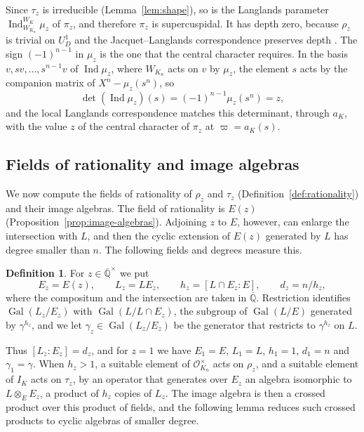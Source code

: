 \documentclass[a4paper,11pt]{amsart}
\theoremstyle{definition}
\newtheorem{definition}[theorem]{Definition}
\theoremstyle{remark}
\numberwithin{equation}{section}
\DeclareMathOperator{\Gal}{Gal}
\newcommand{\Qbar}{\overline{\mathbb{Q}}}
\newcommand{\OO}{\mathcal{O}}
\DeclareMathOperator{\Ind}{Ind}
\begin{document}
Since $\tau_z$ is irreducible (Lemma~\ref{lem:shape}), so is the Langlands parameter $\Ind_{W_{K_n}}^{W_K}\mu_z$ of $\pi_z$, and therefore $\pi_z$ is supercuspidal. It has depth zero, because $\rho_z$ is trivial on $U_D^1$ and the Jacquet--Langlands correspondence preserves depth \cite[Corollary~2.8]{ABPS16}. The sign $(-1)^{n-1}$ in $\mu_z$ is the one that the central character requires. In the basis $v,sv,\dots,s^{n-1}v$ of $\Ind\mu_z$, where $W_{K_n}$ acts on $v$ by $\mu_z$, the element $s$ acts by the companion matrix of $X^n-\mu_z(s^n)$, so
\[
 \det(\Ind\mu_z)(s)=(-1)^{n-1}\mu_z(s^n)=z,
\]
and the local Langlands correspondence matches this determinant, through $a_K$, with the value $z$ of the central character of $\pi_z$ at $\varpi=a_K(s)$.

\subsection{Fields of rationality and image algebras}\label{subsec:image-algebras}

We now compute the fields of rationality of $\rho_z$ and $\tau_z$ (Definition~\ref{def:rationality}) and their image algebras. The field of rationality is $E(z)$ (Proposition~\ref{prop:image-algebras}). Adjoining $z$ to $E$, however, can enlarge the intersection with $L$, and then the cyclic extension of $E(z)$ generated by $L$ has degree smaller than $n$. The following fields and degrees measure this.

\begin{definition}\label{def:coefficient-fields}
For $z\in\Qbar^\times$ we put
\[
 E_z=E(z),\qquad L_z=LE_z,\qquad h_z=[L\cap E_z:E],\qquad d_z=n/h_z,
\]
where the compositum and the intersection are taken in $\Qbar$. Restriction identifies $\Gal(L_z/E_z)$ with $\Gal(L/L\cap E_z)$, the subgroup of $\Gal(L/E)$ generated by $\gamma^{h_z}$, and we let $\gamma_z\in\Gal(L_z/E_z)$ be the generator that restricts to $\gamma^{h_z}$ on $L$.
\end{definition}

Thus $[L_z:E_z]=d_z$, and for $z=1$ we have $E_1=E$, $L_1=L$, $h_1=1$, $d_1=n$ and $\gamma_1=\gamma$. When $h_z>1$, a suitable element of $\OO_{K_n}^\times$ acts on $\rho_z$, and a suitable element of $I_K$ acts on $\tau_z$, by an operator that generates over $E_z$ an algebra isomorphic to $L\otimes_EE_z$, a product of $h_z$ copies of $L_z$. The image algebra is then a crossed product over this product of fields, and the following lemma reduces such crossed products to cyclic algebras of smaller degree.
\end{document}
